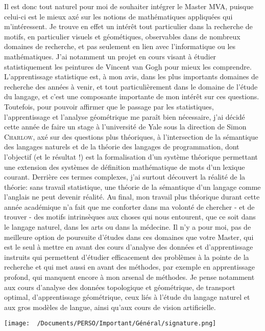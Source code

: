 \documentclass[11pt,a4paper,roman]{moderncv}
\begin{document}
Il est donc tout naturel pour moi de souhaiter intégrer le Master MVA, puisque
celui-ci est le mieux axé sur les notions de mathématiques appliquées qui
m'intéressent.
Je trouve en effet un intérêt tout particulier dans la recherche de motifs, en
particulier visuels et géométiques, observables dans de nombreux domaines de
recherche, et pas seulement en lien avec l'informatique ou les mathématiques.
J'ai notamment un projet en cours visant à étudier statistiquement les
peintures de Vincent van Gogh pour mieux les comprendre.
L'apprentissage statistique est, à mon avis, dans les plus importants domaines
de recherche des années à venir, et tout particulièrement dans le domaine de
l'étude du langage, et c'est une composante importante de mon intérêt sur ces
questions.
Toutefois, pour pouvoir affirmer que le passage par les statistiques,
l'apprentissage et l'analyse géométrique me paraît bien nécessaire,
j'ai décidé cette année de faire un stage à l'université de Yale sous la
direction de Simon \textsc{Charlow}, axé sur des questions plus théoriques,
à l'intersection de la sémantique des langages naturels et de la théorie des
langages de programmation, dont l'objectif (et le résultat !) est la
formalisation d'un système théorique permettant une extension des systèmes de
définition mathématique de mots d'un lexique courant.
Derrière ces termes complexes, j'ai surtout découvert la réalité de la théorie:
sans travail statistique, une théorie de la sémantique d'un langage comme
l'anglais ne peut devenir réalité.
Au final, mon travail plus théorique durant cette année académique n'a fait que
me conforter dans ma volonté de chercher - et de trouver - des motifs
intrinsèques aux choses qui nous entourent, que ce soit dans le langage
naturel, dans les arts ou dans la médecine.
Il n'y a pour moi, pas de meilleure option de poursuite d'études dans ces
domaines que votre Master, qui est le seul à mettre en avant des cours
d'analyse des données et d'apprentissage instruits qui permettent d'étudier
efficacement des problèmes à la pointe de la recherche et qui met aussi en
avant des méthodes, par exemple en apprentissage profond, qui manquent encore
à mon arsenal de méthodes.
Je pense notamment aux cours d'analyse des données topologique et géométrique,
de transport optimal, d'apprentissage géométrique, ceux liés à l'étude du
langage naturel et aux gros modèles de langue, ainsi qu'aux cours de vision
artificielle.

\vspace{1em}
\makeletterclosing
\vspace{-10cm}
\hfill \texttt{[image: ~/Documents/PERSO/Important/Général/signature.png]}
\end{document}

